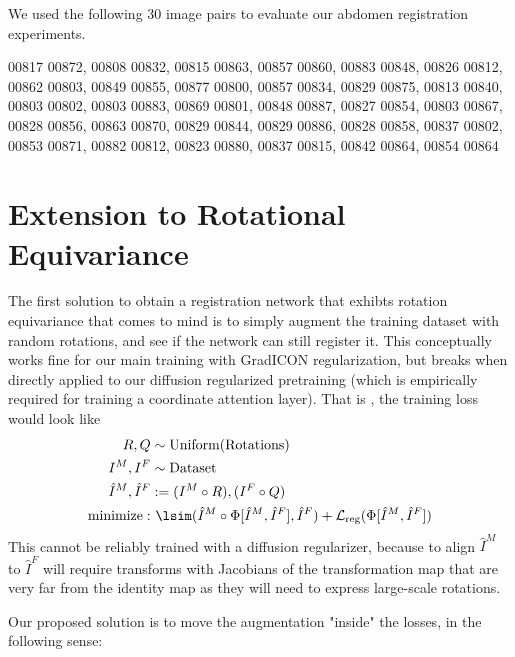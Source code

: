 We used the following 30 image pairs to evaluate our abdomen registration experiments.


00817 00872,
00808 00832,
00815 00863,
00857 00860,
00883 00848,
00826 00812,
00862 00803,
00849 00855,
00877 00800,
00857 00834,
00829 00875,
00813 00840,
00803 00802,
00803 00883,
00869 00801,
00848 00887,
00827 00854,
00803 00867,
00828 00856,
00863 00870,
00829 00844,
00829 00886,
00828 00858,
00837 00802,
00853 00871,
00882 00812,
00823 00880,
00837 00815,
00842 00864,
00854 00864

\section{Extension to Rotational Equivariance}
\label{sec:augmentation}

The first solution to obtain a registration network that exhibts rotation equivariance that comes to mind is to simply augment the training dataset with random rotations, and see if the network can still register it. This conceptually works fine for our main training with GradICON regularization, but breaks when directly applied to our diffusion regularized pretraining (which is empirically required for training a coordinate attention layer).
That is , the training loss would look like
\begin{align}
    R, Q &\sim \text{Uniform}(\text{Rotations}) \\
    I^M, I^F &\sim \text{Dataset} \nonumber \\
    \hat{I}^M, \hat{I}^F &:= (I^M \circ R), (I^F \circ Q) \nonumber \\
    \text{minimize}:& ~\lsim(\hat{I}^M \circ \Phi[\hat{I}^M, \hat{I}^F], \hat{I}^F) + \mathcal{L}_\text{reg}(\Phi[\hat{I}^M, \hat{I}^F]) \nonumber
\end{align}
This cannot be reliably trained with a diffusion regularizer, because to align $\hat{I}^M$ to $\hat{I}^F$  will require transforms with Jacobians of the transformation map that are very far from the identity map as they will need to express large-scale rotations. 

Our proposed solution is to move the augmentation "inside" the losses, in the following sense:

